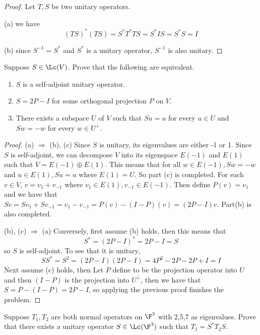 \documentclass{extarticle}
\begin{document}
\begin{proof}
Let \(T, S\) be two unitary operators.

(a) we have
\[(TS)^*(TS) = S^* T^* TS = S^*IS = S^*S = I\]

(b) since \(S^{-1} = S^*\) and \(S^*\) is a unitary operator, \(S^{-1}\) is also unitary.
\end{proof}

\begin{problem}{5}
    Suppose \(S \in \Lc(V)\). Prove that the following are equivalent.
    \begin{enumerate}[label=(\alph*)]
        \item \(S\) is a self-adjoint unitary operator.
        \item \(S = 2P - I\) for some orthogonal projection \(P\) on \(V\).
        \item There exists a subspace \(U\) of \(V\) such that \(Su = u\) for every
        \(u \in U\) and \(Sw = -w\) for every \(w \in U^\perp\).
    \end{enumerate}
\end{problem}

\begin{proof}
(a) \(\Rightarrow\) (b), (c) Since \(S\) is unitary, its eigenvalues are either -1 or 1. Since
\(S\) is self-adjoint, we can decompose \(V\) into its eigenspace \(E(-1)\) and
\(E(1)\) such that \(V = E(-1) \oplus E(1)\). This means that for all \(w \in E(-1),
Sw = - w\) and \(u \in E(1), S u = u\) where \(E(1) = U\). So part (c) is completed. For
each \(v \in V\), \(v = v_1 + v_{-1}\) where \(v_1 \in E(1), v_{-1} \in E(-1)\). Then define
\(P(v) = v_1\) and we have that \(Sv = Sv_1 + S v_{-1} = v_1 - v_{-1} = P(v) - (I - P)(v)
= (2P - I) v\). Part(b) is also completed.

(b), (c) \(\Rightarrow\) (a) Conversely, first assume (b) holds, then this means that
\[S^* = (2P - I)^* = 2P - I = S\]
so \(S\) is self-adjoint. To see that it is unitary,
\[SS^* = S^2 = (2P - I)(2P - I) = 4P^2 - 2P - 2P + I = I\]
Next assume (c) holds, then Let \(P\) define to be the projection operator into \(U\) and then
\((I - P)\) is the projection into \(U^\perp\), then we have that \(S = P - (I - P) = 2P - I\), so
applying the previous proof finishes the problem.
\end{proof}

\begin{problem}{6}
    Suppose \(T_1, T_2\) are both normal operators on \(\F^3\) with 2,5,7 as eigenvalues. Prove
    that there exists a unitary operator \(S \in \Lc(\F^3)\) such that \(T_1 = S^* T_2 S\).
\end{problem}
\end{document}
